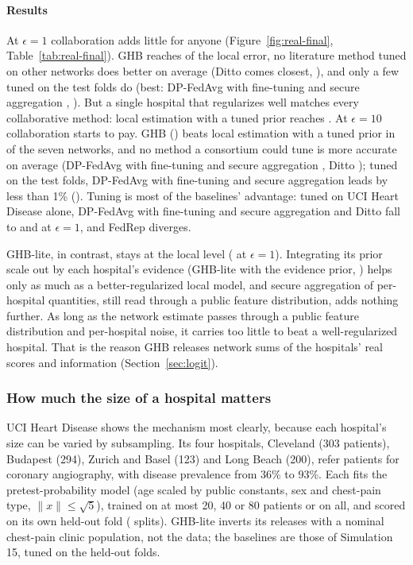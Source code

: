 \paragraph{Results} At $\epsilon=1$ collaboration adds little for anyone (Figure~\ref{fig:real-final}, Table~\ref{tab:real-final}). GHB reaches \SimRFOneV{} of the local error, no literature method tuned on other networks does better on average (Ditto \cite{li2021ditto} comes closest, \SimRFOneDittoLono), and only a few tuned on the test folds do (best: DP-FedAvg \cite{mcmahan2018learning} with fine-tuning and secure aggregation \cite{bonawitz2017practical}, \SimRFOneFTSAOrc). But a single hospital that regularizes well matches every collaborative method: local estimation with a tuned prior reaches \SimRFOneLocLono. At $\epsilon=10$ collaboration starts to pay. GHB (\SimRFTenV) beats local estimation with a tuned prior in \SimRFTenVvsLocWins{} of the seven networks, and no method a consortium could tune is more accurate on average (DP-FedAvg with fine-tuning and secure aggregation \SimRFTenFTSALono, Ditto \SimRFTenDittoLono); tuned on the test folds, DP-FedAvg with fine-tuning and secure aggregation leads by less than 1\% (\SimRFTenFTSAOrc). Tuning is most of the baselines' advantage: tuned on UCI Heart Disease alone, DP-FedAvg with fine-tuning and secure aggregation and Ditto fall to \SimRFOneFTSAUci{} and \SimRFOneDittoUci{} at $\epsilon=1$, and FedRep \cite{collins2021exploiting} diverges.

GHB-lite, in contrast, stays at the local level (\SimRFOneGHB{} at $\epsilon=1$). Integrating its prior scale out by each hospital's evidence (GHB-lite with the evidence prior, \SimRFOneEB) helps only as much as a better-regularized local model, and secure aggregation of per-hospital quantities, still read through a public feature distribution, adds nothing further. As long as the network estimate passes through a public feature distribution and per-hospital noise, it carries too little to beat a well-regularized hospital. That is the reason GHB releases network sums of the hospitals' real scores and information (Section~\ref{sec:logit}).

\subsubsection{How much the size of a hospital matters}\label{sec:heart-size} UCI Heart Disease shows the mechanism most clearly, because each hospital's size can be varied by subsampling. Its four hospitals, Cleveland (303 patients), Budapest (294), Zurich and Basel (123) and Long Beach (200), refer patients for coronary angiography, with disease prevalence from 36\% to 93\%. Each fits the pretest-probability model (age scaled by public constants, sex and chest-pain type, $\|x\|\le\sqrt5$), trained on at most 20, 40 or 80 patients or on all, and scored on its own held-out fold (\SimRealHeartSplits{} splits). GHB-lite inverts its releases with a nominal chest-pain clinic population, not the data; the baselines are those of Simulation 15, tuned on the held-out folds.

